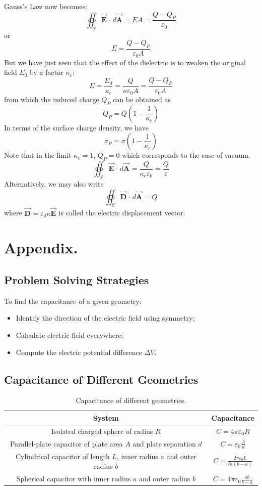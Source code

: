 \documentclass[11pt, letterpaper]{article}
\newcommand{\bv}[2][]{\bm{\vec{#2}_{#1}}}
\begin{document}
Gauss's Law now becomes: \[\oiint_S\bv{E}\cdot\, d\bv{A} = EA = \frac{Q- Q_P}{\varepsilon_0}\] or 
\begin{equation}
	\boxed{E = \frac{Q - Q_P}{\varepsilon_0 A}}
\end{equation}
But we have just seen that the effect of the dielectric is to weaken the original field $E_0$ by a factor $\kappa_e$: \[E = \frac{E_0}{\kappa_e} = \frac{Q}{\kappa\varepsilon_0A} = \frac{Q - Q_P}{\varepsilon_0A}\] from which the induced charge $Q_P$ can be obtained as \[Q_P = Q\left(1 - \frac{1}{\kappa_e}\right)\] In terms of the surface charge density, we have \[\sigma_P = \sigma \left(1 - \frac{1}{\kappa_e}\right)\] Note that in the limit $\kappa_e = 1$, $Q_P = 0$ which corresponds to the case of vacuum. \[\oiint_S \bv{E}\cdot\, d\bv{A} = \frac{Q}{\kappa_e\varepsilon_0} = \frac{Q}{\varepsilon}\] Alternatively, we may also write \[\oiint_S\bv{D}\cdot\, d\bv{A} = Q\] where $\bv{D} = \varepsilon_0\kappa\bv{E}$ is called the electric displacement vector.

\section{Appendix.}
\subsection{Problem Solving Strategies}
To find the capacitance of a given geometry:
\begin{itemize}
	\item Identify the direction of the electric field using symmetry;
	\item Calculate electric field everywhere;
	\item Compute the electric potential difference $\Delta V$.
\end{itemize}
\subsection{Capacitance of Different Geometries}
\begin{table}[h!]
	\centering
	\begin{tabular}{||c|c||}
	\hline
	\textbf{System} & \textbf{Capacitance}\\
	\hline
	Isolated charged sphere of radius $R$ & $C = 4\pi\varepsilon_0R$\\
	\hline
	Parallel-plate capacitor of plate area $A$ and plate separation $d$ & $C = \varepsilon_0\frac{A}{d}$\\
	\hline
	Cylindrical capacitor of length $L$, inner radius $a$ and outer radius $b$ & $C = \frac{2\pi\varepsilon_0L}{ln(b - a)}$\\
	\hline
	Spherical capacitor with inner radius $a$ and outer radius $b$ & $C = 4\pi\varepsilon_0\frac{ab}{b - a}$\\
	\hline
	\end{tabular}
	\caption{\label{tbl:geometries}Capacitance of different geometries.}
\end{table}
\end{document}
